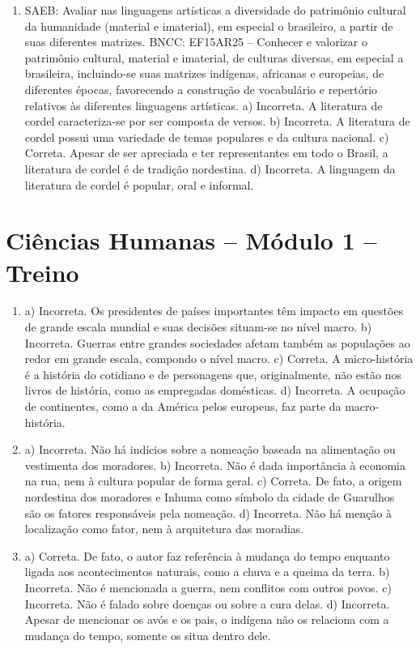 \begin{enumerate}
\item
SAEB: Avaliar nas linguagens artísticas a diversidade do patrimônio
cultural da humanidade (material e imaterial), em especial o brasileiro,
a partir de suas diferentes matrizes.
BNCC: EF15AR25 – Conhecer e valorizar o patrimônio cultural, material e
imaterial, de culturas diversas, em especial a brasileira, incluindo-se
suas matrizes indígenas, africanas e europeias, de diferentes épocas,
favorecendo a construção de vocabulário e repertório relativos às
diferentes linguagens artísticas.
a) Incorreta. A literatura de cordel caracteriza-se por ser composta de versos.
b) Incorreta. A literatura de cordel possui uma variedade de temas
  populares e da cultura nacional.
c) Correta. Apesar de ser apreciada e ter representantes em todo o
  Brasil, a literatura de cordel é de tradição nordestina.
d) Incorreta. A linguagem da literatura de cordel é popular, oral e
  informal.
\end{enumerate}

\section*{Ciências Humanas – Módulo 1 – Treino}

\begin{enumerate}
\item
a) Incorreta. Os presidentes de países importantes têm impacto em
questões de grande escala mundial e suas decisões situam-se no nível
macro.
b) Incorreta. Guerras entre grandes sociedades afetam também as
populações ao redor em grande escala, compondo o nível macro.
c) Correta. A micro-história é a história do cotidiano e de personagens
que, originalmente, não estão nos livros de história, como as empregadas
domésticas.
d) Incorreta. A ocupação de continentes, como a da América pelos
europeus, faz parte da macro-história.

\item
a) Incorreta. Não há indícios sobre a nomeação baseada na alimentação ou vestimenta dos moradores.
b) Incorreta. Não é dada importância à economia na rua, nem à cultura popular de forma geral.
c) Correta. De fato, a origem nordestina dos moradores e Inhuma como símbolo da cidade de Guarulhos são os fatores responsáveis pela
nomeação.
d) Incorreta. Não há menção à localização como fator, nem à arquitetura
das moradias.

\item
a) Correta. De fato, o autor faz referência à mudança do tempo enquanto
ligada aos acontecimentos naturais, como a chuva e a queima da terra.
b) Incorreta. Não é mencionada a guerra, nem conflitos com outros
povos.
c) Incorreta. Não é falado sobre doenças ou sobre a cura delas.
d) Incorreta. Apesar de mencionar os avós e os pais, o indígena não os
relaciona com a mudança do tempo, somente os situa dentro dele.
\end{enumerate}

